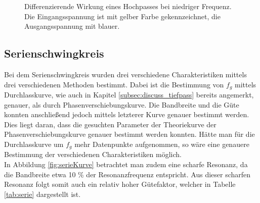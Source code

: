 \documentclass[a4paper,usenatbib]{aspdoc}
\begin{document}
            
                \begin{figure}
                    \hfill
                    \caption{Differenzierende Wirkung eines Hochpasses bei niedriger Frequenz. Die Eingangsspannung ist mit gelber Farbe gekennzeichnet, die Ausgangsspannung mit blauer.}
                    \label{fig:hoch}
                \end{figure}
        
    
        \subsection{Serienschwingkreis}
            Bei dem Serienschwingkreis wurden drei verschiedene Charakteristiken mittels drei verschiedenen Methoden bestimmt. Dabei ist die Bestimmung von $f_g$ mittels Durchlasskurve, wie auch in Kapitel \ref{subsec:discuss_tiefpass} bereits angemerkt, genauer, als durch Phasenverschiebungskurve. Die Bandbreite und die Güte konnten anschließend jedoch mittels letzterer Kurve genauer bestimmt werden. Dies liegt daran, dass die gesuchten Parameter der Theoriekurve der Phasenverschiebungskurve genauer bestimmt werden konnten. Hätte man für die Durchlasskurve um $f_g$ mehr Datenpunkte aufgenommen, so wäre eine genauere Bestimmung der verschiedenen Charakteristiken möglich. 
            \\
            In Abbildung \ref{fig:serieKurve} betrachtet man zudem eine scharfe Resonanz, da die Bandbreite etwa 10 \% der Resonanzfrequenz entspricht. Aus dieser scharfen Resonanz folgt somit auch ein relativ hoher Gütefaktor, welcher in Tabelle \ref{tab:serie} dargestellt ist.
            
\end{document}
